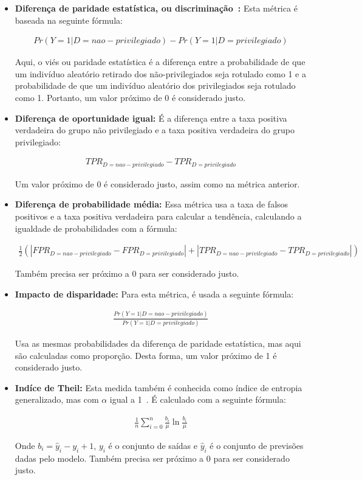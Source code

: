 \documentclass[portugues, 12pt, a4paper]{article}
\begin{document}
\begin{itemize}
\item \textbf{Diferença de paridade estatística, ou discriminação~\citep{Zemel_2013}:} Esta métrica é baseada na seguinte fórmula:

\begin{align*}
Pr(Y=1|D=nao-privilegiado)-Pr(Y=1|D=privilegiado)
\end{align*}
 
Aqui, o viés ou paridade estatística é a diferença entre a probabilidade de que um indivíduo aleatório retirado dos não-privilegiados seja rotulado como 1 e a probabilidade de que um indivíduo aleatório dos privilegiados seja rotulado como 1. Portanto, um valor próximo de 0 é considerado justo.

\item \textbf{Diferença de oportunidade igual:} É a diferença entre a taxa positiva verdadeira do grupo não privilegiado e a taxa positiva verdadeira do grupo privilegiado:

\begin{align*}
TPR_{D=nao-privilegiado} - TPR_{D=privilegiado}
\end{align*}
 
Um valor próximo de 0 é considerado justo, assim como na métrica anterior.

\item \textbf{Diferença de probabilidade média:} Essa métrica usa a taxa de falsos positivos e a taxa positiva verdadeira para calcular a tendência, calculando a igualdade de probabilidades com a fórmula:

\begin{align*}
\frac{1}{2}(|FPR_{D=nao-privilegiado} - FPR_{D=privilegiado}|+|TPR_{D=nao-privilegiado} - TPR_{D=privilegiado}|)
\end{align*}
 
Também precisa ser próximo a 0 para ser considerado justo.

\item \textbf{Impacto de disparidade:} Para esta métrica, é usada a seguinte fórmula:

\begin{align*}
\frac{Pr(Y=1|D=nao-privilegiado)}{Pr(Y=1|D=privilegiado)}
\end{align*}

Usa as mesmas probabilidades da diferença de paridade estatística, mas aqui são calculadas como proporção. Desta forma, um valor próximo de 1 é considerado justo.

\item \textbf{Indíce de Theil:} Esta medida também é conhecida como índice de entropia generalizado, mas com $\alpha$ igual a 1~\citep{Speicher_2018}. É calculado com a seguinte fórmula:

\begin{align*}
\frac{1}{n}\sum^{n}_{i=0}\frac{b_i}{\mu}\ln{\frac{b_i}{\mu}}
\end{align*}

Onde $b_i = \hat{y}_i - y_i + 1$, $y_i$ é o conjunto de saídas e $\hat{y}_i$ é o conjunto de previsões dadas pelo modelo. Também precisa ser próximo a 0 para ser considerado justo.

\end{itemize}
\end{document}
